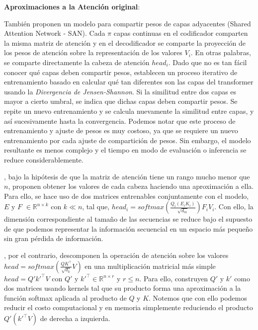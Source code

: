 \textbf{Aproximaciones a la Atención original}:

También \citeauthor{DBLP:journals/corr/abs-1906-11024} proponen un modelo para compartir pesos de
capas adyacentes (Shared Attention Network - SAN). Cada $\pi$ capas continuas en el codificador
comparten la misma matriz de atención y en el decodificador se comparte la proyección de los pesos
de atención sobre la representación de los valores $V_i$. En otras palabras, se comparte directamente
la cabeza de atención $head_i$. Dado que no es tan fácil conocer qué capas deben compartir pesos,
establecen un proceso iterativo de entrenamiento basado en calcular qué tan diferentes son las capas
del transformer usando la \textit{Divergencia de Jensen-Shannon}. Si la similitud entre dos capas es
mayor a cierto umbral, se indica que dichas capas deben compartir pesos. Se repite un nuevo
entrenamiento y se calcula nuevamente la similitud entre capas, y así sucesivamente hasta la
convergencia. Podemos notar que este proceso de entrenamiento y ajuste de pesos es muy costoso, ya
que se requiere un nuevo entrenamiento por cada ajuste de compartición de pesos. Sin embargo, el
modelo resultante es menos complejo y el tiempo en modo de evaluación o inferencia se reduce
considerablemente.

\citeauthor{DBLP:journals/corr/abs-2006-04768}, bajo la hipótesis de que la matriz de atención tiene
un rango mucho menor que $n$, proponen obtener los valores de cada cabeza haciendo una aproximación
a ella. Para ello, se hace uso de dos matrices entrenables conjuntamente con el modelo, $E$ y $F$
$\in \mathbb{R}^{n \times k}$ con $k \ll n$, tal que,
$head_i = softmax(\frac{Q_i (E_i K_i)}{\sqrt{d_m}}) F_iV_i$. Con ello, la dimensión correspondiente
al tamaño de las secuencias se reduce bajo el supuesto de que podemos representar la información
secuencial en un espacio más pequeño sin gran pérdida de información.

\citeauthor{DBLP:journals/corr/abs-2009-14794}, por el contrario, descomponen la operación de
atención sobre los valores $head = softmax(\frac{QK^\top}{\sqrt{d_k}} V)$ en una multiplicación
matricial más simple $head = Q'k'^\top V$ con $Q'$ y $k'^\top \in \mathbb{R}^{n \times r}$ y $r \leq n$.
Para ello, construyen $Q'$ y $k'$ como dos matrices usando kernels tal que su producto forma una
aproximación a la función softmax aplicada al producto de $Q$ y $K$. Notemos que con ello podemos
reducir el costo computacional y en memoria simplemente reduciendo el producto $Q'(k'^\top V)$ de
derecha a izquierda.

